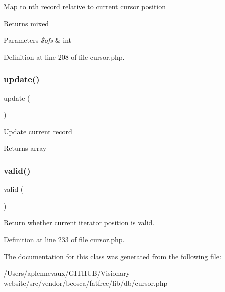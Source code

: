 Map to nth record relative to current cursor position \begin{DoxyReturn}{Returns}
mixed 
\end{DoxyReturn}

\begin{DoxyParams}{Parameters}
{\em \$ofs} & int \\
\hline
\end{DoxyParams}


Definition at line 208 of file cursor.\+php.

\hypertarget{class_d_b_1_1_cursor_a842e4774e3b3601a005b995c02f7e883}{}\label{class_d_b_1_1_cursor_a842e4774e3b3601a005b995c02f7e883} 
\subsubsection{\texorpdfstring{update()}{update()}}
{\footnotesize\ttfamily update (\begin{DoxyParamCaption}{ }\end{DoxyParamCaption})\hspace{0.3cm}{\ttfamily [abstract]}}

Update current record \begin{DoxyReturn}{Returns}
array 
\end{DoxyReturn}
\hypertarget{class_d_b_1_1_cursor_abb9f0d6adf1eb9b3b55712056861a247}{}\label{class_d_b_1_1_cursor_abb9f0d6adf1eb9b3b55712056861a247} 
\subsubsection{\texorpdfstring{valid()}{valid()}}
{\footnotesize\ttfamily valid (\begin{DoxyParamCaption}{ }\end{DoxyParamCaption})}

Return whether current iterator position is valid. 

Definition at line 233 of file cursor.\+php.



The documentation for this class was generated from the following file\+:\begin{DoxyCompactItemize}
\item 
/\+Users/aplennevaux/\+G\+I\+T\+H\+U\+B/\+Visionary-\/website/src/vendor/bcosca/fatfree/lib/db/cursor.\+php\end{DoxyCompactItemize}
